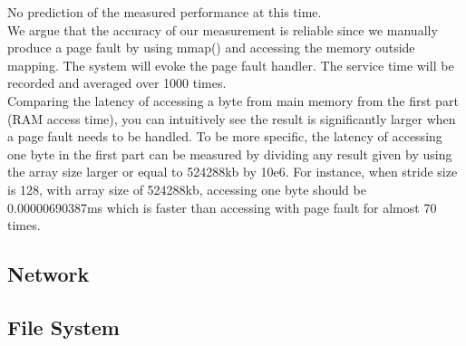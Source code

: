 \begin{enumerate}[\bfseries (a), wide, labelwidth=!, labelindent=0pt]
No prediction of the measured performance at this time.\\
We argue that the accuracy of our measurement is reliable since we manually produce a page fault by using mmap() and accessing the memory outside mapping. The system will evoke the page fault handler. The service time will be recorded and averaged over 1000 times.\\
Comparing the latency of accessing a byte from main memory from the first part (RAM access time), you can intuitively see the result is significantly larger when a page fault needs to be handled. To be more specific, the latency of accessing one byte in the first part can be measured by dividing any result given by using the array size larger or equal to 524288kb by 10e6. For instance, when stride size is 128, with array size of 524288kb, accessing one byte should be 0.00000690387ms which is faster than accessing with page fault for almost 70 times.

\end{enumerate}

\newline
\subsection{Network}

\subsection{File System}



